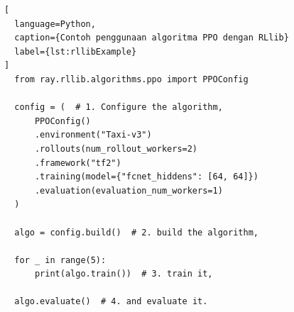 \begin{lstlisting}[
  language=Python,
  caption={Contoh penggunaan algoritma PPO dengan RLlib}
  label={lst:rllibExample}
]
  from ray.rllib.algorithms.ppo import PPOConfig

  config = (  # 1. Configure the algorithm,
      PPOConfig()
      .environment("Taxi-v3")
      .rollouts(num_rollout_workers=2)
      .framework("tf2")
      .training(model={"fcnet_hiddens": [64, 64]})
      .evaluation(evaluation_num_workers=1)
  )

  algo = config.build()  # 2. build the algorithm,

  for _ in range(5):
      print(algo.train())  # 3. train it,

  algo.evaluate()  # 4. and evaluate it.
\end{lstlisting}
